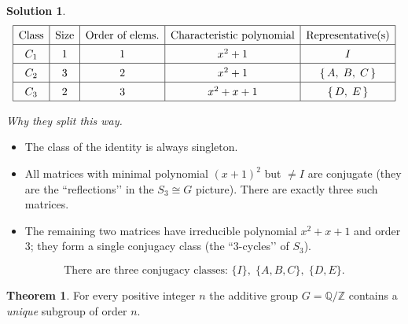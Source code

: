 \documentclass[12pt]{article}
\theoremstyle{definition} %
\newtheorem{solution}{Solution}
\newtheorem{theorem}{Theorem}
\theoremstyle{plain} %
\begin{document}
\begin{solution}
  \[
  \renewcommand{\arraystretch}{1.4}
  \begin{array}{|c|c|c|c|c|}
  \hline
  \text{Class} & \text{Size} & \text{Order of elems.} &
  \text{Characteristic polynomial} & \text{Representative(s)} \\
  \hline
  C_{1} & 1 & 1 & x^{2}+1 & I \\
  \hline
  C_{2} & 3 & 2 & x^{2}+1 & 
     \left\{\,A,\;B,\;C\,\right\} \\
  \hline
  C_{3} & 2 & 3 & x^{2}+x+1 & 
     \left\{\,D,\;E\,\right\} \\
  \hline
  \end{array}
  \]
  
  \textit{Why they split this way.}
  \begin{itemize}
    \item The class of the identity is always singleton.
    \item All matrices with minimal polynomial \((x+1)^{2}\) but \(\neq I\)
          are conjugate (they are the “reflections’’ in the
          $S_{3}\cong G$ picture).  There are exactly three such matrices.
    \item The remaining two matrices have irreducible polynomial
          \(x^{2}+x+1\) and order \(3\); they form a single conjugacy class
          (the “3-cycles’’ of \(S_{3}\)).
  \end{itemize}
  
  \[
  \boxed{\;
     \text{There are three conjugacy classes: } 
     \{I\},\;
     \{A,B,C\},\;
     \{D,E\}.
  \;}
  \]
  \end{solution}
  \begin{theorem}
    For every positive integer \(n\) the additive group 
    \(G=\mathbb{Q}/\mathbb{Z}\) contains a \emph{unique} subgroup of order \(n\).
    \end{theorem}
    
\end{document}
